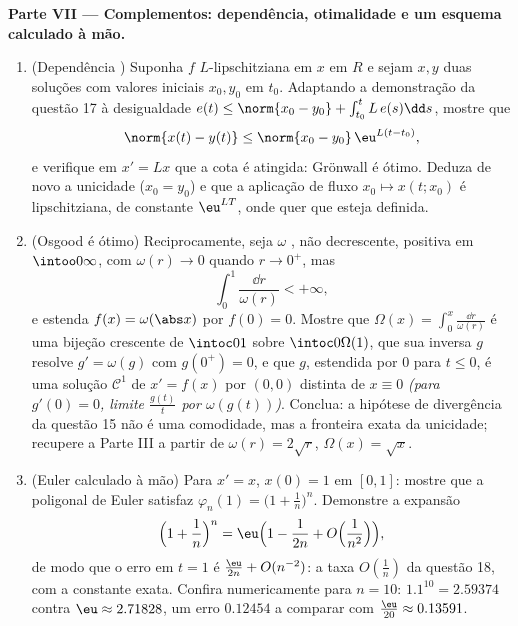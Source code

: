 \begin{problem}[{Problema de fim de semana --- existência de soluções
de $x' = f(t, x)$ sem Lipschitz}]
\medskip
\noindent\textbf{Parte VII --- Complementos: dependência, otimalidade
e um esquema calculado à mão.}
\begin{enumerate}[resume]
  \item (Dependência ) Suponha $f$ $L$-lipschitziana em
        $x$ em $R$ e sejam $x, y$ duas soluções com valores
        iniciais $x_0, y_0$ em $t_0$. Adaptando a demonstração da questão
        17 à desigualdade $e(t) \leq \norm{x_0
        - y_0} + \int_{t_0}^tL\,e(s)\dd s$, mostre que
        \[
        \norm{x(t) - y(t)} \leq \norm{x_0 - y_0}\,
        \eu^{L(t - t_0)},
        \]
        e verifique em $x' = Lx$ que a cota é atingida: Grönwall é ótimo.
        Deduza de novo a unicidade ($x_0 =
        y_0$) e que a aplicação de fluxo
        $x_0 \mapsto x(t; x_0)$ é lipschitziana, de constante $\eu^{LT}$, onde quer que esteja
        definida.
  \item (Osgood é ótimo) Reciprocamente, seja $\omega$ ,
        não decrescente, positiva em $\intoo0\infty$, com $\omega(r) \to 0$ quando $r \to 0^+$, mas
        \[
        \int_0^1\frac{\dd r}{\omega(r)} < +\infty,
        \]
        e estenda $f(x) = \omega(\abs x)$ por $f(0) = 0$. Mostre que $\Omega(x) = \int_0^x\frac{\dd r}{\omega(r)}$ é uma bijeção
        crescente de $\intoc0{1}$ sobre $\intoc0{\Omega(1)}$, que sua inversa $g$ resolve
        $g'
        = \omega(g)$ com $g(0^+) = 0$, e que $g$, estendida por $0$ para $t \leq 0$,
        é uma solução $\mathcal C^1$ de $x' = f(x)$ por $(0, 0)$ distinta de $x \equiv
        0$
        \emph{(para $g'(0) = 0$, limite $\frac{g(t)}t$ por $\omega(g(t))$)}. Conclua: a hipótese
        de divergência da questão 15 não é uma comodidade, mas a
        fronteira exata da unicidade; recupere a Parte III a partir de
        $\omega(r) = 2\sqrt r$, $\Omega(x) = \sqrt x$.
  \item (Euler calculado à mão) Para $x' = x$, $x(0) = 1$ em $[0, 1]$:
        mostre que a poligonal de Euler satisfaz $\varphi_n(1) = \bigl(1 + \frac1n\bigr)^n$. Demonstre a
        expansão
        \[
        \Bigl(1 + \frac1n\Bigr)^{n}
        = \eu\Bigl(1 - \frac1{2n} + O\Bigl(\frac1{n^2}\Bigr)
        \Bigr),
        \]
        de modo que o erro em $t = 1$ é $\frac{\eu}{2n} +
        O(n^{-2})$: a taxa $O(\frac1n)$ da
        questão 18, com a constante exata. Confira numericamente para
        $n = 10$: $1.1^{10} = 2.59374$ contra $\eu \approx 2.71828$, um erro $0.12454$ a comparar com
        $\frac{\eu}{20}
        \approx 0.13591$.
\end{enumerate}
\end{problem}
